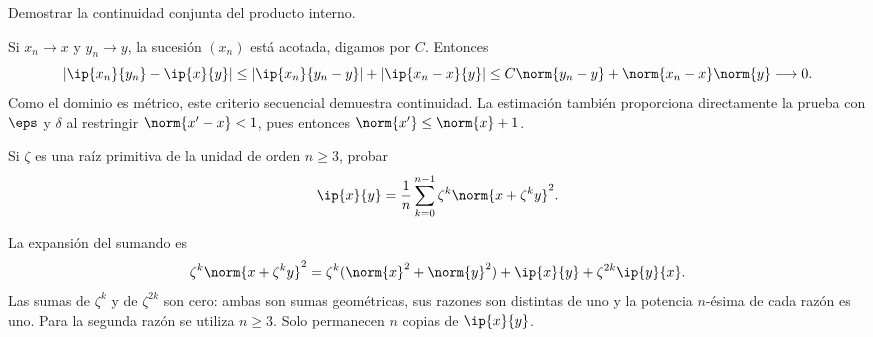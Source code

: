 \begin{ejercicio}\label{ej:lectura-29-4}
Demostrar la continuidad conjunta del producto interno.
\end{ejercicio}
\begin{solucion}
Si $x_n\to x$ y $y_n\to y$, la sucesión $(x_n)$ está acotada, digamos por $C$. Entonces
\[
 |\ip{x_n}{y_n}-\ip{x}{y}|
 \leq |\ip{x_n}{y_n-y}|+|\ip{x_n-x}{y}|
 \leq C\norm{y_n-y}+\norm{x_n-x}\norm{y}\longrightarrow0.
\]
Como el dominio es métrico, este criterio secuencial demuestra continuidad. La estimación también proporciona directamente la prueba con $\eps$ y $\delta$ al restringir $\norm{x'-x}<1$, pues entonces $\norm{x'}\leq\norm{x}+1$.
\end{solucion}

\begin{ejercicio}\label{ej:lectura-29-5}
Si $\zeta$ es una raíz primitiva de la unidad de orden $n\geq3$, probar
\[
 \ip{x}{y}=\frac1n\sum_{k=0}^{n-1}\zeta^k\norm{x+\zeta^ky}^{2}.
\]
\end{ejercicio}
\begin{solucion}
La expansión del sumando es
\[
 \zeta^k\norm{x+\zeta^ky}^{2}
 =\zeta^k(\norm{x}^{2}+\norm{y}^{2})+\ip{x}{y}+\zeta^{2k}\ip{y}{x}.
\]
Las sumas de $\zeta^k$ y de $\zeta^{2k}$ son cero: ambas son sumas geométricas, sus razones son distintas de uno y la potencia $n$-ésima de cada razón es uno. Para la segunda razón se utiliza $n\geq3$. Solo permanecen $n$ copias de $\ip{x}{y}$.
\end{solucion}


